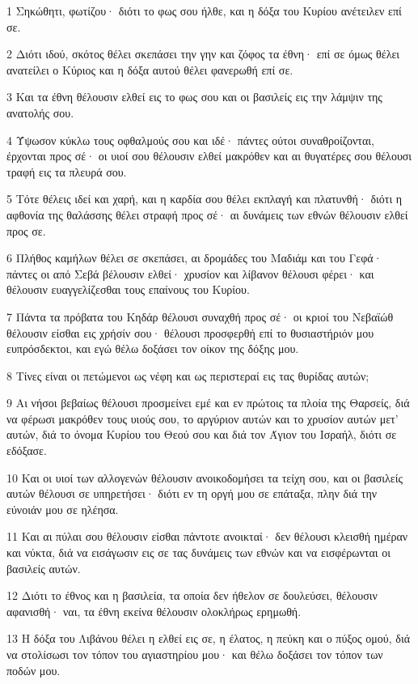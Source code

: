 \par 1 Σηκώθητι, φωτίζου· διότι το φως σου ήλθε, και η δόξα του Κυρίου ανέτειλεν επί σε.
\par 2 Διότι ιδού, σκότος θέλει σκεπάσει την γην και ζόφος τα έθνη· επί σε όμως θέλει ανατείλει ο Κύριος και η δόξα αυτού θέλει φανερωθή επί σε.
\par 3 Και τα έθνη θέλουσιν ελθεί εις το φως σου και οι βασιλείς εις την λάμψιν της ανατολής σου.
\par 4 Ύψωσον κύκλω τους οφθαλμούς σου και ιδέ· πάντες ούτοι συναθροίζονται, έρχονται προς σέ· οι υιοί σου θέλουσιν ελθεί μακρόθεν και αι θυγατέρες σου θέλουσι τραφή εις τα πλευρά σου.
\par 5 Τότε θέλεις ιδεί και χαρή, και η καρδία σου θέλει εκπλαγή και πλατυνθή· διότι η αφθονία της θαλάσσης θέλει στραφή προς σέ· αι δυνάμεις των εθνών θέλουσιν ελθεί προς σε.
\par 6 Πλήθος καμήλων θέλει σε σκεπάσει, αι δρομάδες του Μαδιάμ και του Γεφά· πάντες οι από Σεβά βέλουσιν ελθεί· χρυσίον και λίβανον θέλουσι φέρει· και θέλουσιν ευαγγελίζεσθαι τους επαίνους του Κυρίου.
\par 7 Πάντα τα πρόβατα του Κηδάρ θέλουσι συναχθή προς σέ· οι κριοί του Νεβαϊώθ θέλουσιν είσθαι εις χρήσίν σου· θέλουσι προσφερθή επί το θυσιαστήριόν μου ευπρόσδεκτοι, και εγώ θέλω δοξάσει τον οίκον της δόξης μου.
\par 8 Τίνες είναι οι πετώμενοι ως νέφη και ως περιστεραί εις τας θυρίδας αυτών;
\par 9 Αι νήσοι βεβαίως θέλουσι προσμείνει εμέ και εν πρώτοις τα πλοία της Θαρσείς, διά να φέρωσι μακρόθεν τους υιούς σου, το αργύριον αυτών και το χρυσίον αυτών μετ' αυτών, διά το όνομα Κυρίου του Θεού σου και διά τον Άγιον του Ισραήλ, διότι σε εδόξασε.
\par 10 Και οι υιοί των αλλογενών θέλουσιν ανοικοδομήσει τα τείχη σου, και οι βασιλείς αυτών θέλουσι σε υπηρετήσει· διότι εν τη οργή μου σε επάταξα, πλην διά την εύνοιάν μου σε ηλέησα.
\par 11 Και αι πύλαι σου θέλουσιν είσθαι πάντοτε ανοικταί· δεν θέλουσι κλεισθή ημέραν και νύκτα, διά να εισάγωσιν εις σε τας δυνάμεις των εθνών και να εισφέρωνται οι βασιλείς αυτών.
\par 12 Διότι το έθνος και η βασιλεία, τα οποία δεν ήθελον σε δουλεύσει, θέλουσιν αφανισθή· ναι, τα έθνη εκείνα θέλουσιν ολοκλήρως ερημωθή.
\par 13 Η δόξα του Λιβάνου θέλει η ελθεί εις σε, η έλατος, η πεύκη και ο πύξος ομού, διά να στολίσωσι τον τόπον του αγιαστηρίου μου· και θέλω δοξάσει τον τόπον των ποδών μου.

